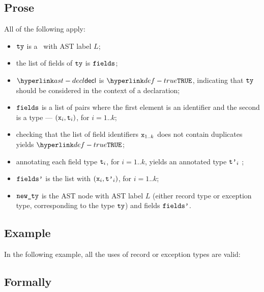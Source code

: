 \subsection{Prose}
All of the following apply:
\begin{itemize}
  \item $\tty$ is a \structuredtype\ with AST label $L$;
  \item the list of fields of $\tty$ is $\fields$;
  \item $\decl$ is $\True$, indicating that $\tty$ should be considered in the context of a declaration;
  \item $\fields$ is a list of pairs where the first element is an identifier and the second is a type --- $(\vx_i, \vt_i)$, for $i=1..k$;
  \item checking that the list of field identifiers $\vx_{1..k}$ does not contain duplicates
  yields $\True$\ProseOrTypeError;
  \item annotating each field type $\vt_i$, for $i=1..k$, yields an annotated type $\vtp_i$
 \ProseOrTypeError;
  \item $\fieldsp$ is the list with $(\vx_i, \vtp_i)$, for $i=1..k$;
  \item $\newty$ is the AST node with AST label $L$ (either record type or exception type,
  corresponding to the type $\tty$) and fields $\fieldsp$.
\end{itemize}

\subsection{Example}
In the following example, all the uses of record or exception types are valid:


\subsection{Formally}
\begin{mathpar}
\end{mathpar}

